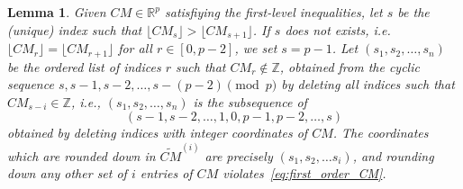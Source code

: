 \documentclass[12pt]{amsart}
\newtheorem{lemma}[thm]{Lemma}
\theoremstyle{definition}
\numberwithin{equation}{section}
\renewcommand\>{\rangle}
\newcommand\<{\langle}
\newcommand\0{\mathbf{0}}
\newcommand\RR{\mathbb{R}}
\newcommand\ZZ{\mathbb{Z}}
\def\wt#1{{\widetilde {#1}}}
\begin{document}
\begin{lemma}\label{l:rounding_noninteger_CM}
	Given $CM \in \RR^p$ satisfiying the first-level inequalities, let $s$ be the (unique) index such that $\lfloor CM_{s} \rfloor > \lfloor CM_{s+1} \rfloor$. If $s$ does not exists, i.e. $\lfloor CM_{r} \rfloor = \lfloor CM_{r+1} \rfloor$ for all $r \in [0,p-2]$, we set $s = p-1$. Let $(s_1, s_2, \dots, s_n)$ be the ordered list of indices $r$ such that $CM_r \notin \ZZ$, obtained from the cyclic sequence $s ,s-1, s-2, \dots, s-(p-2) \pmod p$ by deleting all indices such that $CM_{s-i} \in \ZZ$, i.e., $(s_1, s_2, \dots, s_n)$ is the subsequence of 
	\[
	(s-1,s-2,\ldots,1,0,p-1,p-2,\ldots,s) 
	\]
	obtained by deleting indices with integer coordinates of $CM$.
	The coordinates which are rounded down in $\wt{CM}^{(i)}$ are precisely $(s_1, s_2, \dots s_i)$, and rounding down any other set of $i$ entries of $CM$ violates~\eqref{eq:first_order_CM}.
\end{lemma}
\end{document}
